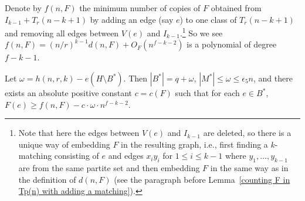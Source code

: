 \documentclass[10pt]{article}
\makeatletter
\newcommand*{\rom}[1]{\expandafter\@slowromancap\romannumeral #1@}
\makeatother
\begin{document}
Denote by $f(n,F)$ the minimum number of copies of $F$ obtained from $I_{k-1}+ T_r(n-k+1)$ by adding an edge (say $e$) to one class of $T_r(n-k+1)$
and removing all edges between $V(e)$ and $I_{k-1}$.\footnote{Note that here the edges between $V(e)$ and $I_{k-1}$ are deleted,
so there is a unique way of embedding $F$ in the resulting graph, i.e., first finding a $k$-matching consisting of $e$ and edges $x_iy_i$ for $1\leq i\leq k-1$ where $y_1,\ldots,y_{k-1}$ are from the same partite set and then embedding $F$ in the same way as in the definition of $d(n,F)$ (see the paragraph before Lemma~\ref{counting F in Tp(n) with adding a matching}).}
So we see $f(n,F)=(n/r)^{k-1}d(n,F)+O_F(n^{f-k-2})$ is a polynomial of degree $f-k-1$.

\medskip


\noindent {\bf Claim~\rom{3}.} Let $\omega=h(n,r,k)-e(H\setminus B^\ast).$ Then $|B^*|=q+\omega$, $|M^*|\leq \omega\leq \epsilon_5 n$,
and there exists an absolute positive constant $c=c(F)$ such that for each $e\in B^*$, $F(e)\geq f(n,F)- c\cdot \omega\cdot n^{f-k-2}$.
\end{document}
